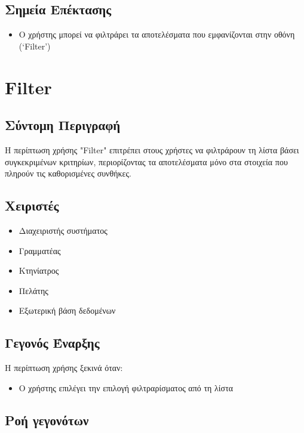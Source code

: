 \documentclass[12pt,a4paper,twoside]{book}
\begin{document}
\subsection{Σημεία Επέκτασης}
\begin{itemize}
  \item Ο χρήστης μπορεί να φιλτράρει τα αποτελέσματα που εμφανίζονται στην οθόνη (`Filter') %
\end{itemize}

\section{Filter}

\subsection{Σύντομη Περιγραφή}
Η περίπτωση χρήσης "Filter" επιτρέπει στους χρήστες να φιλτράρουν τη λίστα βάσει συγκεκριμένων κριτηρίων, περιορίζοντας τα αποτελέσματα μόνο στα στοιχεία που πληρούν τις καθορισμένες συνθήκες. %

\subsection{Χειριστές}
\begin{itemize}
  \item Διαχειριστής συστήματος
  \item Γραμματέας
  \item Κτηνίατρος
  \item Πελάτης
  \item Εξωτερική βάση δεδομένων %
\end{itemize}

\subsection{Γεγονός Έναρξης}
Η περίπτωση χρήσης ξεκινά όταν:
\begin{itemize}
  \item Ο χρήστης επιλέγει την επιλογή φιλτραρίσματος από τη λίστα %
\end{itemize}

\subsection{Ροή γεγονότων}
\end{document}
